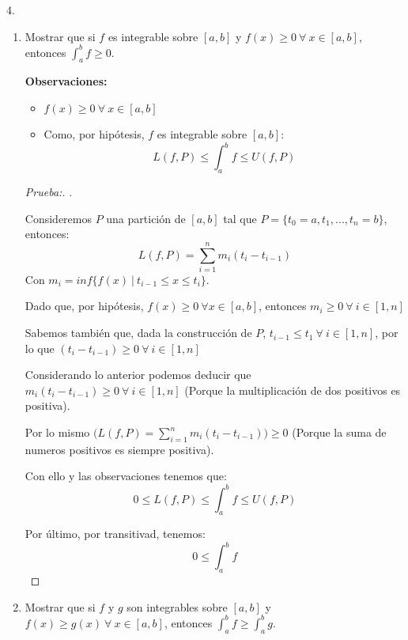 \documentclass[12pt]{article}
\begin{document}
4.
\begin{enumerate}[\hspace{9px} a)]
    \item Mostrar que si $f$ es integrable sobre $[a,b]$ y \(f(x) \geq 0 \ \forall \ x \in [a,b]\), entonces \(\displaystyle\int_{a}^{b}f \geq 0\).\medskip

        \textbf{Observaciones: }
        \begin{itemize}
            \item \(f(x) \geq 0 \ \forall \ x \in [a,b]\)
            \item Como, por hip\'otesis, $f$ es integrable sobre $[a,b]$: \[L(f,P)\leq\int_{a}^{b}f\leq U(f,P)\]
        \end{itemize}

        \begin{proof}[Prueba:]
            . \medskip

            Consideremos $P$ una partici\'on de $[a,b]$ tal que \(P=\{t_0=a,t_1,...,t_n=b\}\), entonces:
            \[L(f,P) = \sum_{i=1}^n m_i(t_i-t_{i-1})\]
            Con \(m_i=inf\{f(x) \ | \ t_{i-1} \leq x \leq t_i\}\).\medskip

            Dado que, por hip\'otesis, \(f(x)\geq 0 \ \forall x \in [a,b]\), entonces \(m_i \geq 0 \ \forall \ i \in [1,n]\)\medskip

            Sabemos tambi\'en que, dada la construcci\'on de $P$, \(t_{i-1}\leq t_1 \ \forall \ i \in [1,n]\), por lo que \((t_i-t_{i-1})\geq 0 \ \forall \ i \in [1,n]\)\medskip

            Considerando lo anterior podemos deducir que \(m_i(t_i-t_{i-1})\geq 0 \ \forall \ i \in [1,n]\) (Porque la multiplicaci\'on de dos positivos es positiva).\medskip

            Por lo mismo \(\big(L(f,P) = \sum_{i=1}^n m_i(t_i-t_{i-1})\big)\geq 0\) (Porque la suma de numeros positivos es siempre positiva).

            Con ello y las observaciones tenemos que:
            \[0\leq L(f,P)\leq\int_{a}^{b}f\leq U(f,P)\]

            Por \'ultimo, por transitivad, tenemos:
            \[0\leq \int_{a}^{b}f\]
        \end{proof}


    \item Mostrar que si $f$ y $g$ son integrables sobre $[a,b]$ y \(f(x) \geq g(x) \ \forall \ x \in [a,b]\), entonces \(\displaystyle\int_{a}^{b}f \geq \displaystyle\int_{a}^{b}g\).\medskip


\end{enumerate}
\end{document}
